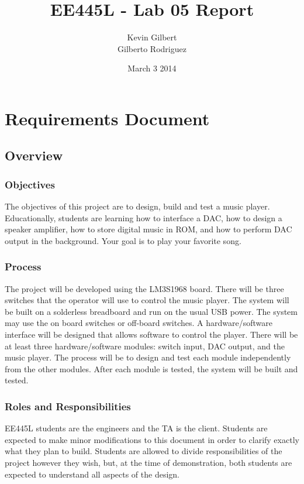\documentclass[twoside]{article}
\title{EE445L - Lab 05 Report}
\author{Kevin Gilbert\\ Gilberto Rodriguez}
\date{March 3 2014}
\begin{document}
\raggedbottom
\maketitle{}

\section*{Requirements Document}
\subsection*{Overview} 
\subsubsection*{Objectives} 
The objectives of this project are to design, build and test a music player. Educationally, students are learning how to interface a DAC, how to design a speaker amplifier, how to store digital music in ROM, and how to perform DAC output in the background. Your goal is to play your favorite song. 
 
\subsubsection*{Process}
The project will be developed using the LM3S1968 board. There will be three switches that the operator will use to control the music player. The system will be built on a solderless breadboard and run on the usual USB power. The system may use the on board switches or off-board switches. A hardware/software interface will be designed that allows software to control the player. There will be at least three hardware/software modules: switch input, DAC output, and the music player. The process will be to design and test each module independently from the other modules. After each module is tested, the system will be built and tested. 
 
\subsubsection*{Roles and Responsibilities}
EE445L students are the engineers and the TA is the client. Students are expected to make minor modifications to this document in order to clarify exactly what they plan to build. Students are allowed to divide responsibilities of the project however they wish, but, at the time of demonstration, both students are expected to understand all aspects of the design. 
 
\end{document}
